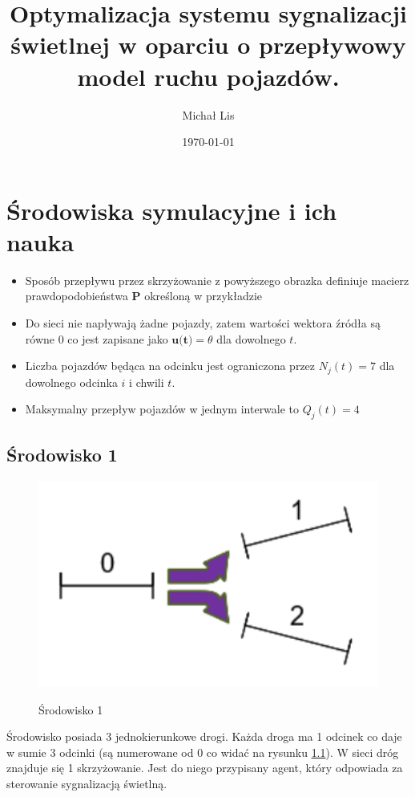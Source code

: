 \documentclass[12pt]{book}
\theoremstyle{plain}
\begin{document}
	\title{Optymalizacja  systemu sygnalizacji świetlnej w 
		oparciu o przepływowy model ruchu pojazdów.}
	\author{Michał Lis}
	\date{\today}
	\maketitle
	\tableofcontents
	
	\chapter {Środowiska symulacyjne i ich nauka}
		\begin{itemize}
		\item Sposób przepływu przez skrzyżowanie z powyższego obrazka definiuje macierz prawdopodobieństwa $ \textbf{P} $ określoną w przykładzie
		\item Do sieci nie napływają żadne pojazdy, zatem wartości wektora źródła są równe 0 co jest zapisane jako $\textbf{u(t)}=\theta$ dla dowolnego $t$. 
		\item Liczba pojazdów będąca na odcinku jest ograniczona przez $N_j(t)=7$ dla dowolnego odcinka $i$ i chwili $t$.
		\item Maksymalny przepływ pojazdów w jednym interwale to $Q_j(t)=4$	
	\end{itemize}
	
	\section{Środowisko 1}
	\begin{figure}[H]
		\centering
		\includegraphics[width=37cm]{images/env_1}
		\label{fig:env_1}
		\caption{Środowisko 1}
	\end{figure}


	Środowisko posiada 3 jednokierunkowe drogi. Każda droga ma 1 odcinek co daje w sumie 3 odcinki (są numerowane od 0 co widać na rysunku \ref{fig:env_1}).
	W sieci dróg znajduje się 1 skrzyżowanie. Jest do niego przypisany agent, który odpowiada za sterowanie sygnalizacją świetlną. 
	
\end{document}
